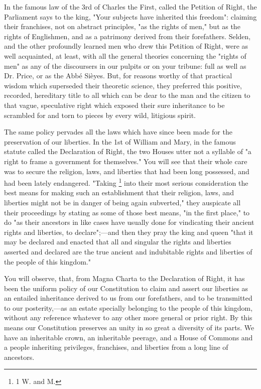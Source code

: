 In the famous law of the 3rd of Charles the First, called the Petition of Right, the Parliament says to the king, "Your subjects have inherited this freedom": claiming their franchises, not on abstract principles, "as the rights of men," but as the rights of Englishmen, and as a patrimony derived from their forefathers. Selden, and the other profoundly learned men who drew this Petition of Right, were as well acquainted, at least, with all the general theories concerning the "rights of men" as any of the discoursers in our pulpits or on your tribune: full as well as Dr. Price, or as the Abbé Sièyes. But, for reasons worthy of that practical wisdom which superseded their theoretic science, they preferred this positive, recorded, hereditary title to all which can be dear to the man and the citizen to that vague, speculative right which exposed their sure inheritance to be scrambled for and torn to pieces by every wild, litigious spirit.

The same policy pervades all the laws which have since been made for the preservation of our liberties. In the 1st of William and Mary, in the famous statute called the Declaration of Right, the two Houses utter not a syllable of "a right to frame a government for themselves." You will see that their whole care was to secure the religion, laws, and liberties that had been long possessed, and had been lately endangered. "Taking
\footnote{ 1 W. and M.}
 into their most serious consideration the best means for making such an establishment that their religion, laws, and liberties might not be in danger of being again subverted," they auspicate all their proceedings by stating as some of those best means, "in the first place," to do "as their ancestors in like cases have usually done for vindicating their ancient rights and liberties, to declare";—and then they pray the king and queen "that it may be declared and enacted that all and singular the rights and liberties asserted and declared are the true ancient and indubitable rights and liberties of the people of this kingdom."

You will observe, that, from Magna Charta to the Declaration of Right, it has been the uniform policy of our Constitution to claim and assert our liberties as an entailed inheritance derived to us from our forefathers, and to be transmitted to our posterity,—as an estate specially belonging to the people of this kingdom, without any reference whatever to any other more general or prior right. By this means our Constitution preserves an unity in so great a diversity of its parts. We have an inheritable crown, an inheritable peerage, and a House of Commons and a people inheriting privileges, franchises, and liberties from a long line of ancestors.

